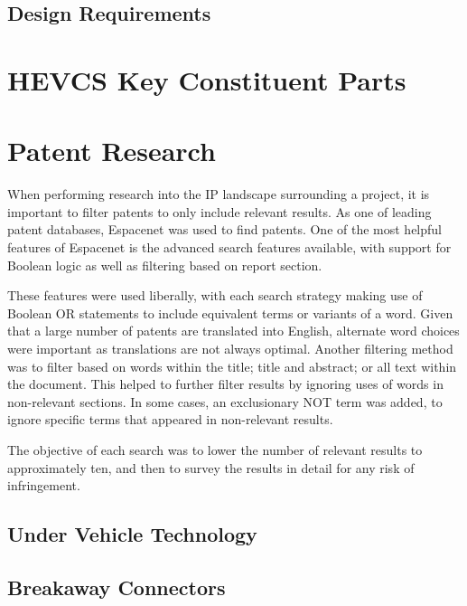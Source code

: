 \documentclass [12pt]{article}
\begin{document}
\subsection{Design Requirements}\label{sec:design_requirements}

\section{HEVCS Key Constituent Parts}\label{sec:constituent_parts}

\section{Patent Research}\label{sec:patent_research}
When performing research into the IP landscape surrounding a project, it is important to filter patents to only include relevant results. As one of leading patent databases, Espacenet was used to find patents. One of the most helpful features of Espacenet is the advanced search features available, with support for Boolean logic as well as filtering based on report section. 

These features were used liberally, with each search strategy making use of Boolean OR statements to include equivalent terms or variants of a word. Given that a large number of patents are translated into English, alternate word choices were important as translations are not always optimal. Another filtering method was to filter based on words within the title; title and abstract; or all text within the document. This helped to further filter results by ignoring uses of words in non-relevant sections. In some cases, an exclusionary NOT term was added, to ignore specific terms that appeared in non-relevant results.

The objective of each search was to lower the number of relevant results to approximately ten, and then to survey the results in detail for any risk of infringement. 

\subsection{Under Vehicle Technology}\label{sec:under_vehilce_technology}
\subsection{Breakaway Connectors}\label{sec:breakaway_connectors}
\end{document}
